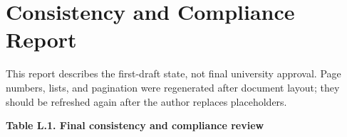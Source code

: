 \chapter{Consistency and Compliance Report}\label{ch:consistency-and-compliance-report}

This report describes the first-draft state, not final university
approval. Page numbers, lists, and pagination were regenerated after
document layout; they should be refreshed again after the author
replaces placeholders.

\par\medskip\noindent\singlespacing
{}
\textbf{Table L.1. Final consistency and compliance review}\par

